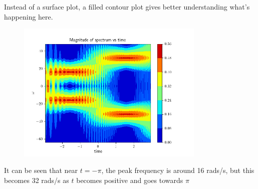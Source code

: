 \documentclass[12pt, a4paper]{article}
\begin{document}
Instead of a surface plot, a filled contour plot gives better understanding what's happening here.

\begin{figure}[H]
\centering
\includegraphics[width=0.8\textwidth]{q6_2.png}
\end{figure}

It can be seen that near $t = -\pi$, the peak frequency is around 16 rads/s, but this becomes 32 rads/s as $t$ becomes positive and goes towards $\pi$
\end{document}
